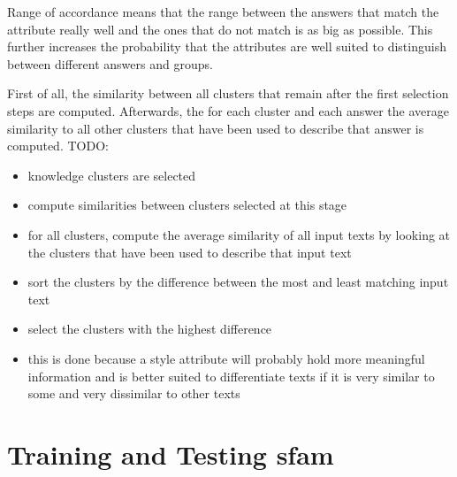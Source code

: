 Range of accordance means that the range between the answers that match the attribute really well and the ones that do not match is as big as possible. This further increases the probability that the attributes are well suited to distinguish between different answers and groups.

First of all, the similarity between all clusters that remain after the first selection steps are computed. Afterwards, the for each cluster and each answer the average similarity to all other clusters that have been used to describe that answer is computed. TODO:


\begin{itemize}
  \item \minNumKnowledgePrompts{} knowledge clusters are selected
  \item compute similarities between clusters selected at this stage
  \item for all clusters, compute the average similarity of all input texts by looking at the clusters that have been used to describe that input text
  \item sort the clusters by the difference between the most and least matching input text
  \item select the clusters with the highest difference
  \item this is done because a style attribute will probably hold more meaningful information and is better suited to differentiate texts if it is very similar to some and very dissimilar to other texts
\end{itemize}


\section{Training and Testing \acs{sfam}}
\label{sec:approach:sfam}

